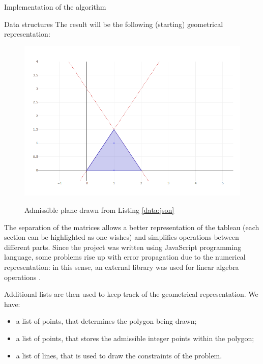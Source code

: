 \documentclass[9pt]{extarticle}
\begin{document}
\begin{section}{Implementation of the algorithm}
\begin{subsection}{Data structures}
            The result will be the following (starting) geometrical representation:
            \vspace{10px}
            \begin{figure}[h]
                \includegraphics[scale=0.4]{problem1.png}
                \centering
                \vspace{20px}
                \begin{description}
                    \centering
                    \item[Figure 1] Admissible plane drawn from Listing \ref{data:json}
                \end{description}
            \end{figure}
            \vspace{10px}
            
            The separation of the matrices allows a better representation of the tableau (each section can be highlighted as one
            wishes) and simplifies operations between different parts.
            Since the project was written using JavaScript programming language, some problems rise up with error propagation due to
            the numerical representation: in this sense, an external library was used for linear algebra operations \cite{github:numbers}. 
            
            Additional lists are then used to keep track of the geometrical representation.
            We have:
            \begin{itemize}
                \item a list of points, that determines the polygon being drawn;
                \item a list of points, that stores the admissible integer points within the polygon;
                \item a list of lines, that is used to draw the constraints of the problem.
            \end{itemize}
        \end{subsection}
        

\end{section}
\end{document}
